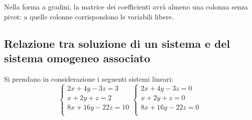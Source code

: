 \begin{nb}
    Nella forma a gradini, la matrice dei coefficienti avrà almeno una colonna senza pivot: a quelle colonne corrispondono le variabili libere.
\end{nb}

\subsection{Relazione tra soluzione di un sistema e del sistema omogeneo associato}
Si prendano in considerazione i seguenti sistemi lineari:
\[
    \begin{cases}
        2x + 4y - 3z = 3 \\
        x + 2y + z = 2 \\
        8x + 16y - 22z = 10 \\
    \end{cases}
    \begin{cases}
        2x + 4y - 3z = 0 \\
        x + 2y + z = 0 \\
        8x + 16y - 22z = 0 \\
    \end{cases}
\]

